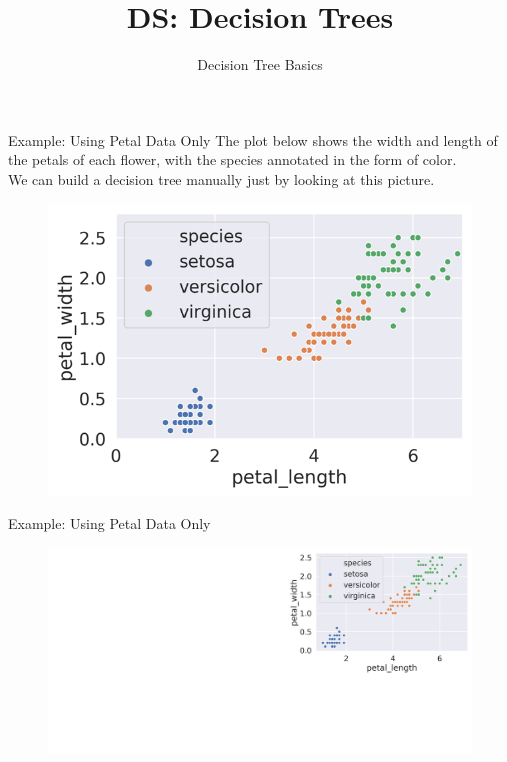 \documentclass[aspectratio=169]{../latex_main/tntbeamer}  %
\title[Introduction]{DS: Decision Trees}
\subtitle{Decision Tree Basics}
\begin{document}
	
	\maketitle
	\begin{frame}{Example: Using Petal Data Only}
	    The plot below shows the width and length of the petals of each flower, with the species annotated in the form of color.\\
	    \bigskip
	    We can build a decision tree manually just by looking at this picture.
	    \begin{figure}
	        \centering
	        \includegraphics[scale=.65]{Bild3}
	    \end{figure}
	\end{frame}
	
	\begin{frame}{Example: Using Petal Data Only}
	    \begin{figure}
	        \includegraphics[scale=.34]{Bild5}
	    \end{figure}
	\end{frame}
	
\end{document}
